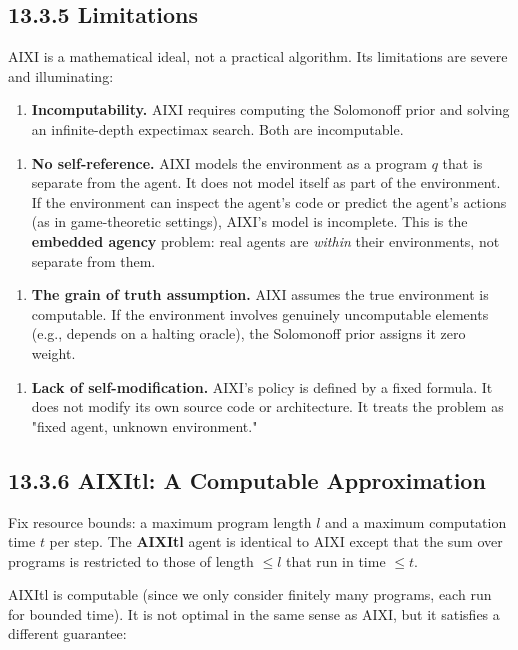 \subsection{13.3.5 Limitations}

AIXI is a mathematical ideal, not a practical algorithm. Its limitations are severe and illuminating:

\begin{enumerate}
\item \textbf{Incomputability.} AIXI requires computing the Solomonoff prior and solving an infinite-depth expectimax search. Both are incomputable.
\end{enumerate}

\begin{enumerate}
\item \textbf{No self-reference.} AIXI models the environment as a program $q$ that is separate from the agent. It does not model itself as part of the environment. If the environment can inspect the agent's code or predict the agent's actions (as in game-theoretic settings), AIXI's model is incomplete. This is the \textbf{embedded agency} problem: real agents are \textit{within} their environments, not separate from them.
\end{enumerate}

\begin{enumerate}
\item \textbf{The grain of truth assumption.} AIXI assumes the true environment is computable. If the environment involves genuinely uncomputable elements (e.g., depends on a halting oracle), the Solomonoff prior assigns it zero weight.
\end{enumerate}

\begin{enumerate}
\item \textbf{Lack of self-modification.} AIXI's policy is defined by a fixed formula. It does not modify its own source code or architecture. It treats the problem as "fixed agent, unknown environment."
\end{enumerate}

\subsection{13.3.6 AIXItl: A Computable Approximation}

\begin{definition}
Fix resource bounds: a maximum program length $l$ and a maximum computation time $t$ per step. The \textbf{AIXItl} agent is identical to AIXI except that the sum over programs is restricted to those of length $\leq l$ that run in time $\leq t$.

AIXItl is computable (since we only consider finitely many programs, each run for bounded time). It is not optimal in the same sense as AIXI, but it satisfies a different guarantee:
\end{definition}

